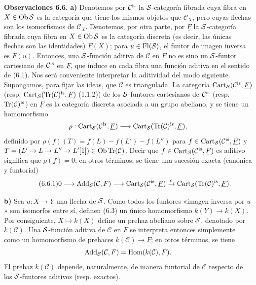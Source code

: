 \textbf{Observaciones 6.6.} \textbf{a)} Denotemos por \(\mathcal C^{\is}\) la \(\sisi{S}{\mathcal S}\)-categoría fibrada cuya fibra en \(X\in\Ob \sisi{S}{\mathcal S}\) es la categoría que tiene los mismos objetos que \(\mathcal C_X\), pero cuyas flechas son los isomorfismos de \(\mathcal C_X\). Denotemos, por otra parte, por \(\underline F\) la \(\sisi{S}{\mathcal S}\)-categoría fibrada cuya fibra en \(X\in\Ob \sisi{S}{\mathcal S}\) es la categoría discreta (es decir, las únicas flechas son las identidades) \(F(X)\); para \(u\in\mathrm{Fl}(\sisi{S}{\mathcal S})\), el funtor de imagen inversa es \(F(u)\). Entonces, una \(\sisi{S}{\mathcal S}\)-función aditiva de \(\mathcal C\) en \(F\) no es sino un \(\sisi{S}{\mathcal S}\)-funtor cartesiano de \(\mathcal C^{\is}\) en \(\underline F\), que induce en cada fibra una función aditiva en el sentido de (6.1). Nos será conveniente interpretar la aditividad del modo siguiente. Supongamos, para fijar las ideas, que \(\mathcal C\) es triangulada. La categoría \(\Cart\sisi{_S}{_{\mathcal S}}(\mathcal C^{\is},\underline F)\) (resp. \(\Cart\sisi{_S}{_{\mathcal S}}(\Tr(\mathcal C)^{\is},\underline F)\) (1.1.2)) de los \(\sisi{S}{\mathcal S}\)-funtores cartesianos de \(\mathcal C^{\is}\) (resp. \(\Tr(\mathcal C)^{\is}\)) en \(\underline F\) es la categoría discreta asociada a un grupo abeliano, y se tiene un homomorfismo
\[
  \rho:\Cart\sisi{_S}{_{\mathcal S}}(\mathcal C^{\is},\underline F)
  \longrightarrow
  \Cart\sisi{_S}{_{\mathcal S}}(\Tr(\mathcal C)^{\is},\underline F),
\]
definido por \(\rho(f)(T)=f(L)-f(L')-f(L'')\) para \(f\in\Cart\sisi{_S}{_{\mathcal S}}(\mathcal C^{\is},\underline F)\) y \(T=(L'\to L\to L''\to L'[1])\in\Ob\Tr(\mathcal C)\). Decir que \(f\in\Cart\sisi{_S}{_{\mathcal S}}(\mathcal C^{\is},\underline F)\) es aditivo significa que \(\rho(f)=0\); en otros términos, se tiene una sucesión exacta (canónica y funtorial)
\begin{equation}\tag{6.6.1}
  0\longrightarrow \Add\sisi{_S}{_{\mathcal S}}(\mathcal C,F)
  \longrightarrow \Cart\sisi{_S}{_{\mathcal S}}(\mathcal C^{\is},\underline F)
  \xrightarrow{\rho}
  \Cart\sisi{_S}{_{\mathcal S}}(\Tr(\mathcal C)^{\is},\underline F).
\end{equation}

\textbf{b)} Sea \(u:X\to Y\) una flecha de \(\sisi{S}{\mathcal S}\). Como todos los funtores «imagen inversa por \(u\)» son isomorfos entre sí, definen (6.3) un único homomorfismo \(k(Y)\longrightarrow k(X)\). Por consiguiente, \(X\mapsto k(X)\) define un prehaz abeliano sobre \(\sisi{S}{\mathcal S}\), denotado por \(k(\mathcal C)\). Una \(\sisi{S}{\mathcal S}\)-función aditiva de \(\mathcal C\) en \(F\) se interpreta entonces simplemente como un homomorfismo de prehaces \(k(\mathcal C)\longrightarrow F\); en otros términos, se tiene
\[
  \Add\sisi{_S}{_{\mathcal S}}(\mathcal C,F)=\Hom(k(\mathcal C),F).
\]
El prehaz \(k(\mathcal C)\) depende, naturalmente, de manera funtorial de \(\mathcal C\) respecto de los \(\sisi{S}{\mathcal S}\)-funtores aditivos (resp. exactos).

